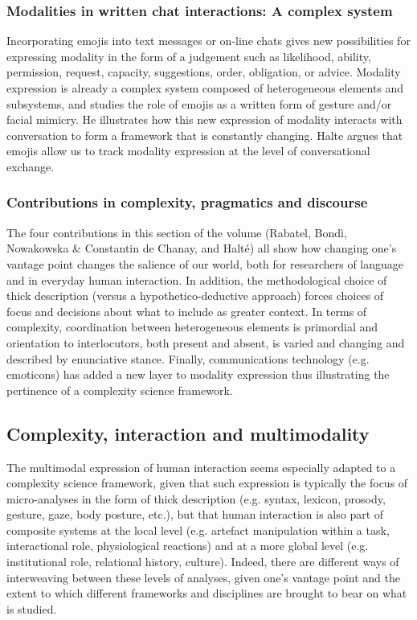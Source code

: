 \documentclass[output=paper]{langscibook}
\begin{document}
\subsubsection{Modalities in written chat interactions: A complex system}

Incorporating emojis into text messages or on-line chats gives new possibilities for expressing modality in the form of a judgement such as likelihood, ability, permission, request, capacity, suggestions, order, obligation, or advice. Modality expression is already a complex system composed of heterogeneous elements and subsystems, and  studies the role of emojis as a written form of gesture and/or facial mimicry. He illustrates how this new expression of modality interacts with conversation to form a framework that is constantly changing. Halte argues that emojis allow us to track modality expression at the level of conversational exchange.

\subsubsection{Contributions in complexity, pragmatics and discourse}

The four contributions in this section of the volume (Rabatel, Bondì, Nowakowska \& Constantin de Chanay, and Halté) all show how changing one’s vantage point changes the salience of our world, both for researchers of language and in everyday human interaction. In addition, the methodological choice of thick description (versus a hypothetico-deductive approach) forces choices of focus and decisions about what to include as greater context. In terms of complexity, coordination between heterogeneous elements is primordial and orientation to interlocutors, both present and absent, is varied and changing and described by enunciative stance. Finally, communications technology (e.g. emoticons) has added a new layer to modality expression thus illustrating the pertinence of a complexity science framework.

\subsection{Complexity, interaction and multimodality}

The multimodal expression of human interaction seems especially adapted to a complexity science framework, given that such expression is typically the focus of micro-analyses in the form of thick description (e.g. syntax, lexicon, prosody, gesture, gaze, body posture, etc.), but that human interaction is also part of composite systems at the local level (e.g. artefact manipulation within a task, interactional role, physiological reactions) and at a more global level (e.g. institutional role, relational history, culture). Indeed, there are different ways of interweaving between these levels of analyses, given one’s vantage point and the extent to which different frameworks and disciplines are brought to bear on what is studied.  
\end{document}
